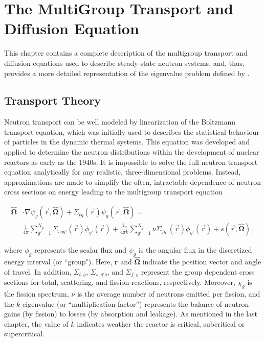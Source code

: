 \cleardoublepage

\chapter{The MultiGroup Transport and Diffusion Equation}
\label{chapter:multigroup}

This chapter contains a complete description of the multigroup transport and diffusion equations used to describe steady-state neutron systems, and, thus, provides a more detailed representation of the eigenvalue problem defined by . 

\section{Transport Theory}

Neutron transport can be well modeled by linearization of the Boltzmann transport equation, which was initially used to describes the statistical behaviour of particles in the dynamic thermal systems.
This equation was developed and applied to determine the neutron distributions within the development of nuclear reactors as early as the 1940s.
It is impossible to solve the full neutron transport equation analytically for any realistic, three-dimensional problems.
Instead, approximations are made to simplify the often, intractable dependence of neutron cross sections on energy leading to the multigroup transport equation 

\begin{equation}
\begin{split}
  \bm{\hat{\Omega}} & \cdot \nabla \psi_g(\vec{r},\bm{\hat{\Omega}}) +
    \Sigma_{t g}(\vec{r}) \psi_{g}(\vec{r},\bm{\hat{\Omega}}) = \\
   & \frac{1}{4\pi} \sum\limits^{N_g}_{g'=1} \Sigma_{s g g'}(\vec{r}) \phi_{g'}(\vec{r}) +
    \frac{\chi_g}{4\pi k} \sum\limits^{N_g}_{g'=1} \nu\Sigma_{fg'}(\vec{r}) \phi_{g'}(\vec{r}) 
    + s(\vec{r},\bm{\hat{\Omega}})\, ,
\end{split}
\label{eq:transport}
\end{equation}

where $\phi_g$ represents the scalar flux and $\psi_g$ is the angular flux in the discretized energy interval (or ``group").  
Here, $\mathbf{r}$ and $\bm{\hat{\Omega}}$ indicate the position vector and angle of travel.
In addition, $\Sigma_{t,g}$, $\Sigma_{s,g\prime g}$, and $\Sigma_{f,g}$ represent the group dependent cross sections for total, scattering, and fission reactions, respectively.
Moreover, $\chi_g$ is the fission spectrum, $\nu$ is the average number of neutrons emitted per fission, and the $k$-eigenvalue (or ``multiplication factor'') represents the balance of neutron gains (by fission) to losses (by absorption and leakage).  
As mentioned in the last chapter, the value of $k$ indicates weather the reactor is critical, subcritical or supercritical.


